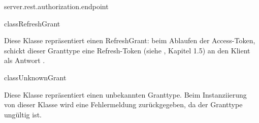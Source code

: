 \begin{texdocpackage}{server.rest.authorization.endpoint}
\begin{texdocclass}{class}{RefreshGrant}
\label{texdoclet:edu.kit.informatik.studyplan.server.rest.authorization.endpoint.RefreshGrant}
\begin{texdocclassintro}
Diese Klasse repräsentiert einen RefreshGrant: beim Ablaufen der Access-Token, schickt dieser Granttype
 eine Refresh-Token (siehe \cite{rfc6749}, Kapitel 1.5) an den Klient als Antwort .\end{texdocclassintro}
\begin{texdocclassconstructors}
\end{texdocclassconstructors}
\begin{texdocclassmethods}
\end{texdocclassmethods}
\end{texdocclass}


\begin{texdocclass}{class}{UnknownGrant}
\label{texdoclet:edu.kit.informatik.studyplan.server.rest.authorization.endpoint.UnknownGrant}
\begin{texdocclassintro}
Diese Klasse repräsentiert einen unbekannten Granttype. Beim Instanziierung von dieser Klasse wird 
 eine Fehlermeldung zurückgegeben, da der Granttype ungültig ist.\end{texdocclassintro}
\begin{texdocclassconstructors}
\end{texdocclassconstructors}
\begin{texdocclassmethods}
\end{texdocclassmethods}
\end{texdocclass}


\end{texdocpackage}



